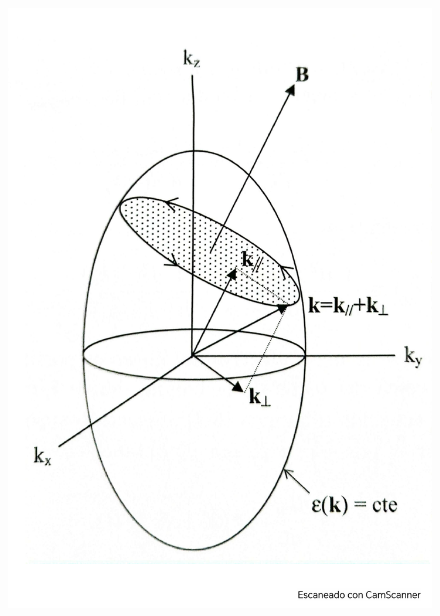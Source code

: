 \begin{figure}[h!] \centering
	\includegraphics[scale=0.5]{Cuerpo/Ch_08/Fotos libro 3.pdf}
	\caption{}
	\label{Fig:08-03}
\end{figure}
